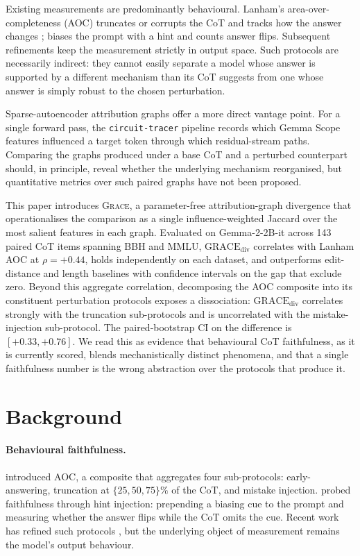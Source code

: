 \documentclass{article}
\newcommand{\GRACE}{\textsc{Grace}}
\newcommand{\gdiv}{\mathrm{GRACE}_{\text{div}}}
\begin{document}
Existing measurements are predominantly behavioural. Lanham's
area-over-completeness (AOC) truncates or corrupts the CoT and tracks how
the answer changes \citep{lanham2023}; \citet{turpin2023} biases the
prompt with a hint and counts answer flips. Subsequent refinements
\citep{atanasova2023, parcalabescu2024, meek2025} keep the measurement
strictly in output space. Such protocols are necessarily indirect: they
cannot easily separate a model whose answer is supported by a different
mechanism than its CoT suggests from one whose answer is simply robust
to the chosen perturbation.

Sparse-autoencoder attribution graphs offer a more direct vantage point.
For a single forward pass, the \texttt{circuit-tracer} pipeline
\citep{hanna2025} records which Gemma Scope features
\citep{lieberum2024} influenced a target token through which
residual-stream paths. Comparing the graphs produced under a base CoT
and a perturbed counterpart should, in principle, reveal whether the
underlying mechanism reorganised, but quantitative metrics over such
paired graphs have not been proposed.

This paper introduces \GRACE{}, a parameter-free attribution-graph
divergence that operationalises the comparison as a single
influence-weighted Jaccard over the most salient features in each graph.
Evaluated on Gemma-2-2B-it \citep{gemmateam2024} across 143 paired CoT
items spanning BBH and MMLU, $\gdiv$ correlates with Lanham AOC at
$\rho = {+}0.44$, holds independently on each dataset, and outperforms
edit-distance and length baselines with confidence intervals on the gap
that exclude zero. Beyond this aggregate correlation, decomposing the
AOC composite into its constituent perturbation protocols exposes a
dissociation: $\gdiv$ correlates strongly with the truncation
sub-protocols and is uncorrelated with the mistake-injection
sub-protocol. The paired-bootstrap CI on the difference is
$[+0.33, +0.76]$. We read this as evidence that behavioural CoT
faithfulness, as it is currently scored, blends mechanistically distinct
phenomena, and that a single faithfulness number is the wrong
abstraction over the protocols that produce it.

\section{Background}
\label{sec:background}

\paragraph{Behavioural faithfulness.}
\citet{lanham2023} introduced AOC, a composite that aggregates four
sub-protocols: early-answering, truncation at $\{25, 50, 75\}\%$ of the
CoT, and mistake injection. \citet{turpin2023} probed faithfulness
through hint injection: prepending a biasing cue to the prompt and
measuring whether the answer flips while the CoT omits the cue. Recent
work has refined such protocols
\citep{atanasova2023, parcalabescu2024, meek2025}, but the underlying
object of measurement remains the model's output behaviour.
\end{document}
